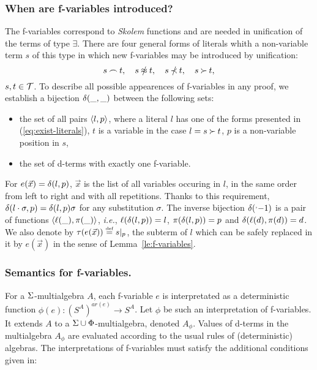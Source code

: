 \subsubsection{When are f-variables introduced?}
%
The f-variables correspond to {\em Skolem} functions and are needed in
unification of the terms of type $\exists$.  There are four general forms of
literals whith a non-variable term $s$ of this type in which new
f-variables may be introduced by unification:
\begin{equation} \label{eq:exist-literals}
 s\Int t,\quad s\notEq t, \quad s\notIncl t, \quad  s\Cont t,
\end{equation} 
\(s,t \in {\cal T}\).  To describe all possible appearences of f-variables
in any proof, we establish a bijection $\delta(\_,\_)$ between the following sets:
\begin{itemize}%
\item the set of all pairs \(\langle l,p\rangle\), where a literal $l$ has one of the
forms presented in (\ref {eq:exist-literals}), $t$ is
a variable in the case \(l= s\mathbin{\succ} t\), $p$ is a non-variable position
in $s$,
\item the set of d-terms with exactly one f-variable.
\end{itemize}
For \(e(\vec x)=\delta(l,p)\), \(\vec x\) is the list of all variables occuring in
$l$, in the same order from left to right and with all repetitions.  Thanks
to this requirement, \(\delta(l\cdot \sigma,p)=\delta(l,p)\sigma\) for any
substitution $\sigma$.  The inverse bijection $\expandafter\inverse\dt
\hide\_$ is a pair of functions \(\langle\ell(\_), \pi(\_)\rangle\), {\it i.e.}, \(\ell(\delta(l,p))=l\), \(\pi(\delta(l,p))=p\) and \(\delta(\ell(d),\pi(d))=d\).  We also denote by
$\tau(e(\vec x))\mathrel {\stackrel {\mbox {\tiny def}}{=}} s|_{p}$, the subterm of $l$ which can be safely
replaced in it by $e(\vec x)$ in the sense of Lemma~\ref {le:f-variables}.
%
\subsubsection{Semantics for f-variables.}
%
For a  \(\Sigma\)-multialgebra $A$, each f-variable $e$ is
interpretated as a deterministic function \(\phi(e): (S^A)^{ar(e)}\to S^A\).
Let $\phi$ be such an interpretation of f-variables. It
extends  $A$ to a \(\Sigma\cup\Phi\)-multialgebra, denoted
 \(A_\phi\).  Values of d-terms in the multialgebra \(A_\phi\) are
evaluated according to the usual rules of (deterministic) algebras.  
The interpretations of f-variables must satisfy the additional conditions
given in:

